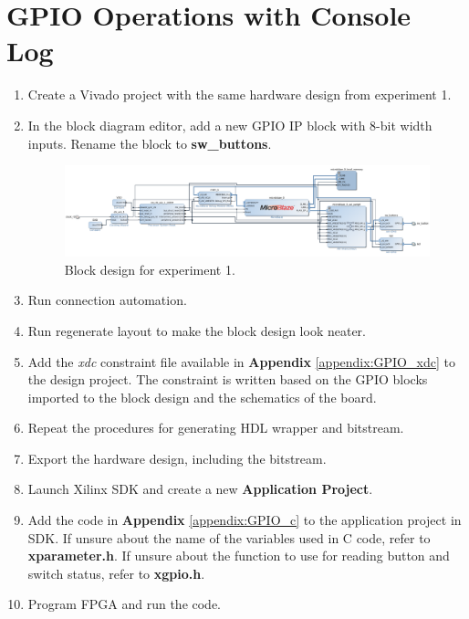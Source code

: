 \documentclass[11pt,letterpaper,titlepage]{article}
\begin{document}
\newpage

\section{GPIO Operations with Console Log}

\begin{enumerate}
    \item Create a Vivado project with the same hardware design from experiment 1.
    
    \item In the block diagram editor, add a new GPIO IP block with 8-bit width inputs. Rename the block to \textbf{sw\_buttons}.
    
    \begin{figure}[ht]
    \centering
    \includegraphics[width=\textwidth]{Ex2_layout.png}
    \caption{Block design for experiment 1.}
    \end{figure}
    
    \item Run connection automation.
    
    \item Run regenerate layout to make the block design look neater.
    
    \item Add the \textit{xdc} constraint file available in \textbf{Appendix} \ref{appendix:GPIO_xdc} to the design project. The constraint is written based on the GPIO blocks imported to the block design and the schematics of the board.
    
    \item Repeat the procedures for generating HDL wrapper and bitstream. 
    
    \item Export the hardware design, including the bitstream.
    
    \item Launch Xilinx SDK and create a new \textbf{Application Project}.
    
    \item Add the code in \textbf{Appendix} \ref{appendix:GPIO_c} to the application project in SDK. If unsure about the name of the variables used in C code, refer to \textbf{xparameter.h}. If unsure about the function to use for reading button and switch status, refer to \textbf{xgpio.h}.
    
    \item Program FPGA and run the code. 
    
\end{enumerate}
\end{document}
